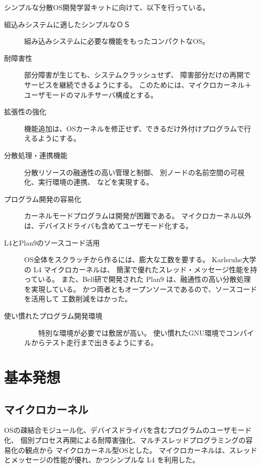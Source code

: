 \documentclass{jarticle}
\begin{document}
シンプルな分散OS開発学習キットに向けて、以下を行っている。

\begin{description}

\item[組込みシステムに適したシンプルなＯＳ]
    組み込みシステムに必要な機能をもったコンパクトなOS。
    
\item[耐障害性]
    部分障害が生じても、システムクラッシュせず、
    障害部分だけの再開でサービスを継続できるようにする。
    このためには、マイクロカーネル＋ユーザモードのマルチサーバ構成とする。
    
\item[拡張性の強化]
    機能追加は、OSカーネルを修正せず、できるだけ外付けプログラムで行えるようにする。
    
\item[分散処理・連携機能]
      分散リソースの融通性の高い管理と制御、
      別ノードの名前空間の可視化、実行環境の連携、
      などを実現する。
    
\item[プログラム開発の容易化]
    カーネルモードプログラムは開発が困難である。
    マイクロカーネル以外は、デバイスドライバも含めてユーザモード化する。
    
\item[L4とPlan9のソースコード活用]  
     OS全体をスクラッチから作るには、膨大な工数を要する。
    Karlsruhe大学の L4 マイクロカーネルは、 
    簡潔で優れたスレッド・メッセージ性能を持っている。
    また、Bell研で開発された Plan9 は、融通性の高い分散処理を実現している。
    かつ両者ともオープンソースであるので、ソースコードを活用して
    工数削減をはかった。
    
\item[使い慣れたプログラム開発環境]
　　特別な環境が必要では敷居が高い。
    使い慣れたGNU環境でコンパイルからテスト走行まで出きるようにする。

\end{description}    



\section{基本発想}

\subsection{マイクロカーネル}

   OSの疎結合モジュール化、デバイスドライバを含むプログラムのユーザモード化、
  個別プロセス再開による耐障害強化、マルチスレッドプログラミングの容易化の観点から
  マイクロカーネル型OSとした。
  マイクロカーネルは、スレッドとメッセージの性能が優れ、かつシンプルな
  L4 を利用した。
\end{document}
